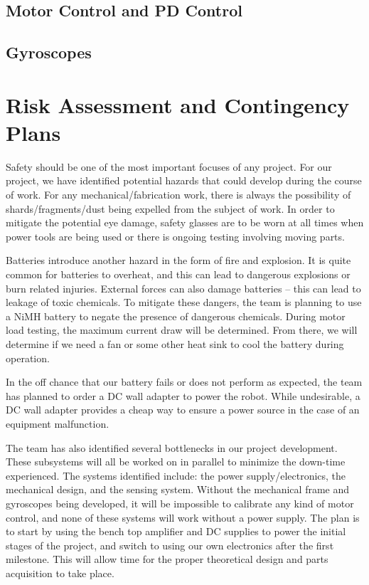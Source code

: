 \documentclass[11pt]{report}
\begin{document}
\begin{spacing}{1.5}
\subsection*{Motor Control and PD Control}

\subsection*{Gyroscopes}

\section*{Risk Assessment and Contingency Plans} %

Safety should be one of the most important focuses of any project. For our project, we have identified potential hazards that could develop during the course of work. For any mechanical/fabrication work, there is always the possibility of shards/fragments/dust being expelled from the subject of work. In order to mitigate the potential eye damage, safety glasses are to be worn at all times when power tools are being used or there is ongoing testing involving moving parts. 

Batteries introduce another hazard in the form of fire and explosion. It is quite common for batteries to overheat, and this can lead to dangerous explosions or burn related injuries. External forces can also damage batteries – this can lead to leakage of toxic chemicals. To mitigate these dangers, the team is planning to use a NiMH battery to negate the presence of dangerous chemicals. During motor load testing, the maximum current draw will be determined. From there, we will determine if we need a fan or some other heat sink to cool the battery during operation. 

In the off chance that our battery fails or does not perform as expected, the team has planned to order a DC wall adapter to power the robot. While undesirable, a DC wall adapter provides a cheap way to ensure a power source in the case of an equipment malfunction. 

The team has also identified several bottlenecks in our project development. These subsystems will all be worked on in parallel to minimize the down-time experienced. The systems identified include: the power supply/electronics, the mechanical design, and the sensing system. Without the mechanical frame and gyroscopes being developed, it will be impossible to calibrate any kind of motor control, and none of these systems will work without a power supply. The plan is to start by using the bench top amplifier and DC supplies to power the initial stages of the project, and switch to using our own electronics after the first milestone. This will allow time for the proper theoretical design and parts acquisition to take place.  


\end{spacing}
\end{document}
